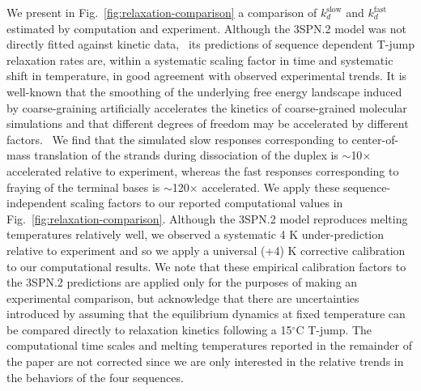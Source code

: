 \documentclass[journal=jpcbfk,manuscript=article]{achemso}
\begin{document}
We present in Fig.~\ref{fig:relaxation-comparison} a comparison of $k_d^\mathrm{slow}$ and $k_d^\mathrm{fast}$ estimated by computation and experiment. Although the 3SPN.2 model was not directly fitted against kinetic data,~\cite{Hinckley2013AnHybridization} its predictions of sequence dependent T-jump relaxation rates are, within a systematic scaling factor in time and systematic shift in temperature, in good agreement with observed experimental trends. It is well-known that the smoothing of the underlying free energy landscape induced by coarse-graining artificially accelerates the kinetics of coarse-grained molecular simulations and that different degrees of freedom may be accelerated by different factors.~\citep{Marrink2007TheSimulations, Fritz2011MultiscaleDynamics, Marrink2013PerspectiveModel} We find that the simulated slow responses corresponding to center-of-mass translation of the strands during dissociation of the duplex is $\sim$10$\times$ accelerated relative to experiment, whereas the fast responses corresponding to fraying of the terminal bases is $\sim$120$\times$ accelerated. We apply these sequence-independent scaling factors to our reported computational values in Fig.~\ref{fig:relaxation-comparison}. Although the 3SPN.2 model reproduces melting temperatures relatively well, we observed a systematic 4 K under-prediction relative to experiment and so we apply a universal (+4) K corrective calibration to our computational results. We note that these empirical calibration factors to the 3SPN.2 predictions are applied only for the purposes of making an experimental comparison, but acknowledge that there are uncertainties introduced by assuming that the equilibrium dynamics at fixed temperature can be compared directly to relaxation kinetics following a 15$^\circ$C T-jump. The computational time scales and melting temperatures reported in the remainder of the paper are not corrected since we are only interested in the relative trends in the behaviors of the four sequences.
\end{document}
